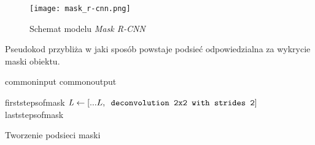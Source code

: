 \begin{figure}[h]
  \centering
  \caption{Schemat modelu \textit{Mask R-CNN}}
  \texttt{[image: mask\_r-cnn.png]}
  \label{fig:mask_r_cnn}
\end{figure}

Pseudokod  przybliża w jaki sposób powstaje podsieć odpowiedzialna za wykrycie maski obiektu.

\begin{algorithm}
  {commoninput}
  {commonoutput}
  \begin{algorithmic}[1]
    {firststepsofmask}
    \State $\mathit{L} \gets [...L,\verb| deconvolution 2x2 with strides 2|]$
    {laststepsofmask}
	\end{algorithmic}
	\caption{Tworzenie podsieci maski}
	\label{alg:mask-r-cnn}
\end{algorithm}
